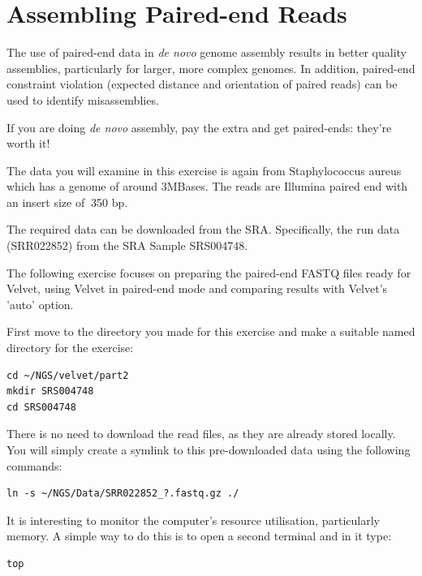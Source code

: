 \section{Assembling Paired-end Reads}

The use of paired-end data in \textit{de novo} genome assembly results in better
quality assemblies, particularly for larger, more complex genomes. In addition,
paired-end constraint violation (expected distance and orientation of paired
reads) can be used to identify misassemblies.

\begin{warning}
If you are doing \textit{de novo} assembly, pay the extra and get paired-ends:
they're worth it!
\end{warning}

\begin{note}
The data you will examine in this exercise is again from Staphylococcus aureus
which has a genome of around 3MBases. The reads are Illumina paired end with an
insert size of $~$350 bp.

The required data can be downloaded from the SRA. Specifically, the run data
(SRR022852) from the SRA Sample SRS004748.


\end{note}

\begin{information}
The following exercise focuses on preparing the paired-end FASTQ files ready for
Velvet, using Velvet in paired-end mode and comparing results with Velvet's
'auto' option.
\end{information}

\begin{steps}
First move to the directory you made for this exercise and make a suitable named
directory for the exercise:
\begin{lstlisting}
cd ~/NGS/velvet/part2 
mkdir SRS004748 
cd SRS004748
\end{lstlisting}

There is no need to download the read files, as they are already stored
locally. You will simply create a symlink to this pre-downloaded data using
the following commands:
\begin{lstlisting}
ln -s ~/NGS/Data/SRR022852_?.fastq.gz ./
\end{lstlisting}

It is interesting to monitor the computer's resource utilisation, particularly
memory. A simple way to do this is to open a second terminal and in it type:
\begin{lstlisting}
top
\end{lstlisting}
\end{steps}

